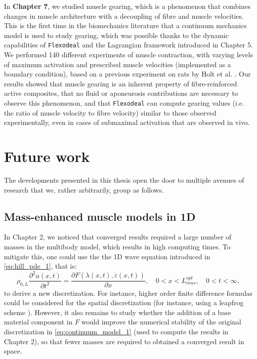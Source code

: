 \documentclass{sfuthesis}
\numberwithin{equation}{section}
\numberwithin{figure}{chapter}
\numberwithin{table}{chapter}
\theoremstyle{definition}
\newcommand{\pder}[2]{\dfrac{\partial #1}{\partial #2}}
\newcommand{\depsilon}{\dot{\varepsilon}}
\begin{document}
In \textbf{Chapter 7}, we studied muscle gearing, which is a phenomenon that combines changes in muscle architecture with a decoupling of fibre and muscle velocities. This is the first time in the biomechanics literature that a continuum mechanics model is used to study gearing, which was possible thanks to the dynamic capabilities of \texttt{Flexodeal} and the Lagrangian framework introduced in Chapter 5. We performed 140 different experiments of muscle contraction, with varying levels of maximum activation and prescribed muscle velocities (implemented as a boundary condition), based on a previous experiment on rats by Holt et al. \cite{Holt2016}.
Our results showed that muscle gearing is an inherent property of fibre-reinforced active composites, that no fluid or aponeurosis contributions are necessary to observe this phenomenon, and that \texttt{Flexodeal} can compute gearing values (i.e. the ratio of muscle velocity to fibre velocity) similar to those observed experimentally, even in cases of submaximal activation that are observed in vivo.

\section{Future work}

The developments presented in this thesis open the door to multiple avenues of research that we, rather arbitrarily, group as follows.

\subsection{Mass-enhanced muscle models in 1D}

In Chapter 2, we noticed that converged results required a large number of masses in the multibody model, which results in high computing times. To mitigate this, one could use the the 1D wave equation introduced in \eqref{eq:hill_pde_1}, that is:
\begin{equation}
    \rho_{0,L} \pder{^2 u(x,t)}{t^2}  = \pder{F(\lambda(x,t),\depsilon(x,t))}{x}, \quad 0 < x < L_{mus}^{opt}, \quad 0 < t < \infty,
\end{equation}
to derive a new discretization. For instance, higher order finite difference formulas could be considered for the spatial discretization (for instance, using a leapfrog scheme \cite{Strikwerda}). However, it also remains to study whether the addition of a base material component in $F$ would improve the numerical stability of the original discretization in \eqref{eq:continuum_model_1} (used to compute the results in Chapter 2), so that fewer masses are required to obtained a converged result in space.
\end{document}
